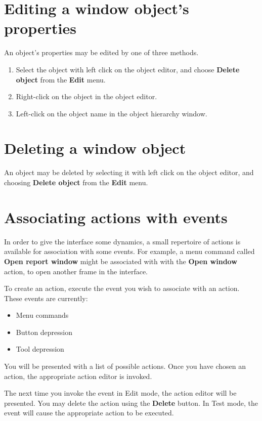 \section{Editing a window object's properties}

An object's properties may be edited by one of three methods.

\begin{enumerate}
\item Select the object with left click on the object editor, and
choose {\bf Delete object} from the {\bf Edit} menu.
\item Right-click on the object in the object editor.
\item Left-click on the object name in the object hierarchy window.
\end{enumerate}

\section{Deleting a window object}

An object may be deleted by selecting it with left click on the
object editor, and choosing {\bf Delete object} from the {\bf Edit} menu.

\section{Associating actions with events}

In order to give the interface some dynamics, a small repertoire
of actions is available for association with some events. For example, a menu
command called {\bf Open report window} might be associated with
with the {\bf Open window} action, to open another frame in the interface.

To create an action, execute the event you wish to associate with an
action. These events are currently:

\begin{itemize}
\item Menu commands
\item Button depression
\item Tool depression
\end{itemize}

You will be presented with a list of possible actions. Once you have
chosen an action, the appropriate action editor is invoked.

The next time you invoke the event in Edit mode, the action editor will
be presented. You may delete the action using the {\bf Delete} button.
In Test mode, the event will cause the appropriate action to be executed.


